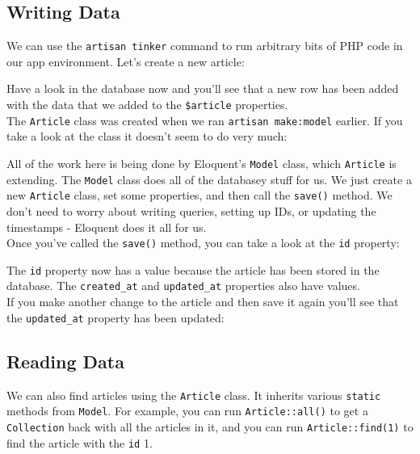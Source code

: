 \pagebreak

\subsection{Writing Data}

We can use the \texttt{artisan tinker} command to run arbitrary bits of PHP code in our app environment. Let's create a new article:


Have a look in the database now and you'll see that a new row has been added with the data that we added to the \texttt{\$article} properties.
\\

The \texttt{Article} class was created when we ran \texttt{artisan make:model} earlier. If you take a look at the class it doesn't seem to do very much:


All of the work here is being done by Eloquent's \texttt{Model} class, which \texttt{Article} is extending. The \texttt{Model} class does all of the databasey stuff for us. We just create a new \texttt{Article} class, set some properties, and then call the \texttt{save()} method. We don't need to worry about writing queries, setting up IDs, or updating the timestamps - Eloquent does it all for us.
\\

Once you've called the \texttt{save()} method, you can take a look at the \texttt{id} property:


The \texttt{id} property now has a value because the article has been stored in the database. The \texttt{created\_at} and \texttt{updated\_at} properties also have values.
\\

If you make another change to the article and then save it again you'll see that the \texttt{updated\_at} property has been updated:



\subsection{Reading Data}

We can also find articles using the \texttt{Article} class. It inherits various \texttt{static} methods from \texttt{Model}. For example, you can run \texttt{Article::all()} to get a \texttt{Collection} back with all the articles in it, and you can run \texttt{Article::find(1)} to find the article with the \texttt{id} 1.

